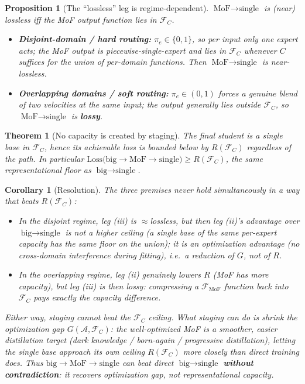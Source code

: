 \documentclass[11pt,a4paper]{article}
\newcommand{\Fc}{\mathcal{F}_C}
\newtheorem{proposition}{Proposition}
\newtheorem{theorem}{Theorem}
\newtheorem{corollary}{Corollary}
\begin{document}
\begin{proposition}[The ``lossless'' leg is regime-dependent]\label{prop:regime}
$\text{MoF}\!\to\!\text{single}$ is (near) lossless \emph{iff} the MoF output function lies in $\Fc$.
\begin{itemize}[leftmargin=1.4em]
  \item \textbf{Disjoint-domain / hard routing:} $\pi_e\in\{0,1\}$, so per input only one expert acts;
  the MoF output is piecewise-single-expert and lies in $\Fc$ whenever $C$ suffices for the
  \emph{union} of per-domain functions. Then $\text{MoF}\!\to\!\text{single}$ is near-lossless.
  \item \textbf{Overlapping domains / soft routing:} $\pi_e\in(0,1)$ forces a genuine blend of two
  velocities at the \emph{same} input; the output generally lies \emph{outside} $\Fc$, so
  $\text{MoF}\!\to\!\text{single}$ is \textbf{lossy}.
\end{itemize}
\end{proposition}

\begin{theorem}[No capacity is created by staging]\label{thm:ceiling}
The final student is a single base in $\Fc$, hence its achievable loss is bounded below by $R(\Fc)$
regardless of the path. In particular
$\mathrm{Loss}\big(\text{big}\!\to\!\text{MoF}\!\to\!\text{single}\big)\ge R(\Fc)$, the same
representational floor as $\text{big}\!\to\!\text{single}$.
\end{theorem}

\begin{corollary}[Resolution]\label{cor:resolution}
The three premises never hold simultaneously in a way that beats $R(\Fc)$:
\begin{itemize}[leftmargin=1.4em]
  \item In the disjoint regime, leg (iii) is $\approx$lossless, but then leg (ii)'s advantage over
  $\text{big}\!\to\!\text{single}$ is \emph{not} a higher ceiling (a single base of the same per-expert
  capacity has the same floor on the union); it is an \emph{optimization} advantage (no cross-domain
  interference during fitting), i.e.\ a reduction of $G$, not of $R$.
  \item In the overlapping regime, leg (ii) genuinely lowers $R$ (MoF has more capacity), but leg
  (iii) is then lossy: compressing a $\mathcal F_{\text{MoF}}$ function back into $\Fc$ pays exactly the
  capacity difference.
\end{itemize}
Either way, staging cannot beat the $\Fc$ ceiling. What staging \emph{can} do is shrink the
optimization gap $G(\mathcal A,\Fc)$: the well-optimized MoF is a smoother, easier distillation target
(dark knowledge / born-again / progressive distillation), letting the single base approach its
\emph{own} ceiling $R(\Fc)$ more closely than direct training does. Thus
$\text{big}\!\to\!\text{MoF}\!\to\!\text{single}$ can beat \emph{direct} $\text{big}\!\to\!\text{single}$
\textbf{without contradiction}: it recovers optimization gap, not representational capacity.
\end{corollary}
\end{document}
